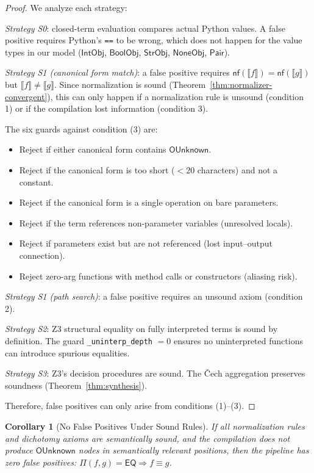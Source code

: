 \documentclass[11pt,a4paper]{report}
\theoremstyle{definition}
\theoremstyle{plain}
\newtheorem{corollary}[definition]{Corollary}
\newcommand{\den}[1]{\llbracket #1 \rrbracket}
\begin{document}
\begin{proof}
We analyze each strategy:

\emph{Strategy S0}: closed-term evaluation compares actual Python
values.  A false positive requires Python's \texttt{==} to be wrong,
which does not happen for the value types in our model
($\mathsf{IntObj}$, $\mathsf{BoolObj}$, $\mathsf{StrObj}$,
$\mathsf{NoneObj}$, $\mathsf{Pair}$).

\emph{Strategy S1 (canonical form match)}: a false positive requires
$\mathsf{nf}(\den{f}) = \mathsf{nf}(\den{g})$ but
$\den{f} \neq \den{g}$.  Since normalization is sound
(Theorem~\ref{thm:normalizer-convergent}), this can only happen if a
normalization rule is unsound (condition 1) or if the compilation lost
information (condition 3).

The six guards against condition (3) are:
\begin{itemize}
  \item Reject if either canonical form contains $\mathsf{OUnknown}$.
  \item Reject if the canonical form is too short ($< 20$ characters)
    and not a constant.
  \item Reject if the canonical form is a single operation on
    bare parameters.
  \item Reject if the term references non-parameter variables
    (unresolved locals).
  \item Reject if parameters exist but are not referenced
    (lost input--output connection).
  \item Reject zero-arg functions with method calls or constructors
    (aliasing risk).
\end{itemize}

\emph{Strategy S1 (path search)}: a false positive requires an
unsound axiom (condition 2).

\emph{Strategy S2}: Z3 structural equality on fully interpreted
terms is sound by definition.  The guard
\texttt{\_uninterp\_depth} $= 0$ ensures no uninterpreted functions
can introduce spurious equalities.

\emph{Strategy S3}: Z3's decision procedures are sound.  The
\v{C}ech aggregation preserves soundness
(Theorem~\ref{thm:synthesis}).

Therefore, false positives can only arise from conditions (1)--(3).
\end{proof}

\begin{corollary}[No False Positives Under Sound Rules]
If all normalization rules and dichotomy axioms are semantically
sound, and the compilation does not produce $\mathsf{OUnknown}$
nodes in semantically relevant positions, then the pipeline has
\emph{zero false positives}: $\Pi(f,g) = \mathsf{EQ} \Rightarrow
f \equiv g$.
\end{corollary}
\end{document}
